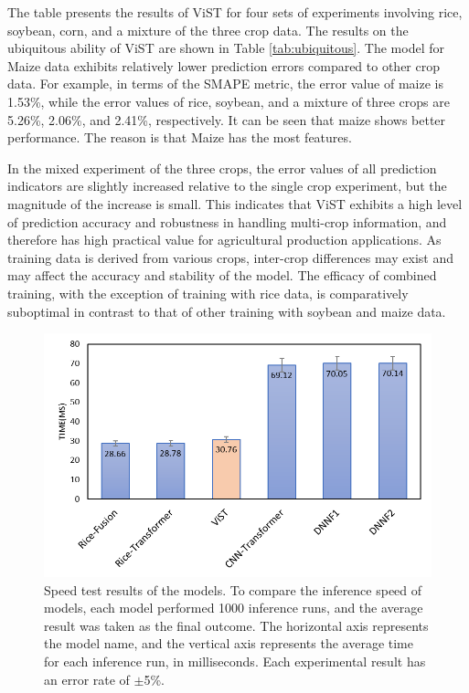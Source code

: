 \documentclass[acmsmall, screen]{acmart}
\begin{document}
The table presents the results of ViST for four sets of experiments involving rice, soybean, corn, and a mixture of the three crop data. The results on the ubiquitous ability of ViST are shown in Table \ref{tab:ubiquitous}. The model for Maize data exhibits relatively lower prediction errors compared to other crop data. For example, in terms of the SMAPE metric, the error value of maize is 1.53\%, while the error values of rice, soybean, and a mixture of three crops are 5.26\%, 2.06\%, and 2.41\%, respectively. It can be seen that maize shows better performance. The reason is that Maize has the most features.

In the mixed experiment of the three crops, the error values of all prediction indicators are slightly increased relative to the single crop experiment, but the magnitude of the increase is small. This indicates that ViST exhibits a high level of prediction accuracy and robustness in handling multi-crop information, and therefore has high practical value for agricultural production applications. As training data is derived from various crops, inter-crop differences may exist and may affect the accuracy and stability of the model. The efficacy of combined training, with the exception of training with rice data, is comparatively suboptimal in contrast to that of other training with soybean and maize data.
\begin{figure}[h]
  \centering
  \includegraphics[width=0.6\linewidth]{pic/speed_test.png}
  \caption{Speed test results of the models. To compare the inference speed of models, each model performed 1000 inference runs, and the average result was taken as the final outcome. The horizontal axis represents the model name, and the vertical axis represents the average time for each inference run, in milliseconds. Each experimental result has an error rate of \begin{math}
    \pm
  \end{math}5\%.}
  \label{speed_test}
\end{figure}
\end{document}
